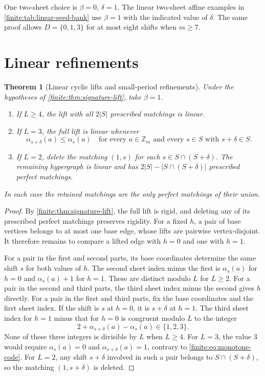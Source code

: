 \documentclass[10pt]{article}
\numberwithin{equation}{section}
\newtheorem{theorem}{Theorem}[section]
\begin{document}
One two-sheet choice is $\beta=0$, $\delta=1$. The linear two-sheet affine examples in \cref{finite:tab:linear-seed-bank} use $\beta=1$ with the indicated value of $\delta$. The same proof allows $D=\{0,1,3\}$ for at most eight shifts when $m\ge7$.

\section{Linear refinements}\label{finite:sec:linear-lifts}
\begin{theorem}[Linear cyclic lifts and small-period refinements]
\label{finite:thm:linear-lift}
Under the hypotheses of \cref{finite:thm:signature-lift}, take $\beta=1$.
\begin{enumerate}
\item If $L\ge4$, the lift with all $2|S|$ prescribed matchings is linear.
\item If $L=3$, the full lift is linear whenever
\begin{equation}\label{finite:eq:monotone-code}
 \alpha_{s+\delta}(a)\le\alpha_s(a)
 \quad\text{for every }a\in\mathbb Z_m\text{ and every }s\in S\text{ with }s+\delta\in S.
\end{equation}
\item If $L=2$, delete the matching $(1,s)$ for each $s\in S\cap(S+\delta)$. The remaining hypergraph is linear and has $2|S|-|S\cap(S+\delta)|$ prescribed perfect matchings.
\end{enumerate}
In each case the retained matchings are the only perfect matchings of their union.
\end{theorem}
\begin{proof}
By \cref{finite:thm:signature-lift}, the full lift is rigid, and deleting any of its prescribed perfect matchings preserves rigidity. For a fixed $h$, a pair of base vertices belongs to at most one base edge, whose lifts are pairwise vertex-disjoint. It therefore remains to compare a lifted edge with $h=0$ and one with $h=1$.

For a pair in the first and second parts, its base coordinates determine the same shift $s$ for both values of $h$. The second sheet index minus the first is $\alpha_s(a)$ for $h=0$ and $\alpha_s(a)+1$ for $h=1$. These are distinct modulo $L$ for $L\ge2$. For a pair in the second and third parts, the third sheet index minus the second gives $h$ directly. For a pair in the first and third parts, fix the base coordinates and the first sheet index. If the shift is $s$ at $h=0$, it is $s+\delta$ at $h=1$. The third sheet index for $h=1$ minus that for $h=0$ is congruent modulo $L$ to the integer
\[
 2+\alpha_{s+\delta}(a)-\alpha_s(a)\in\{1,2,3\}.
\]
None of these three integers is divisible by $L$ when $L\ge4$. For $L=3$, the value 3 would require $\alpha_s(a)=0$ and $\alpha_{s+\delta}(a)=1$, contrary to \cref{finite:eq:monotone-code}. For $L=2$, any shift $s+\delta$ involved in such a pair belongs to $S\cap(S+\delta)$, so the matching $(1,s+\delta)$ is deleted.
\end{proof}
\end{document}
